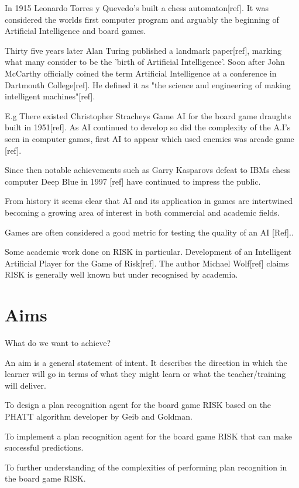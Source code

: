 \documentclass[parskip]{cs4rep}
\begin{document}
In 1915 Leonardo Torres y Quevedo's built a chess automaton[ref]. It was considered the worlds first computer program and arguably the beginning of Artificial Intelligence and board games.

Thirty five years later Alan Turing published a landmark paper[ref], marking what many consider to be the 'birth of Artificial Intelligence'. Soon after John McCarthy officially coined the term Artificial Intelligence at a conference in Dartmouth College[ref]. He defined it as "the science and engineering of making intelligent machines"[ref].

E.g
There existed Christopher Stracheys Game AI for the board game draughts built in 1951[ref]. As AI continued to develop so did the complexity of the A.I's seen in computer games, first AI to appear which used enemies was arcade game [ref].

Since then notable achievements such as Garry Kasparovs defeat to IBMs chess computer Deep Blue in 1997 [ref] have continued to impress the public. 

From history it seems clear that AI and its application in games are intertwined becoming a growing area of interest in both commercial and academic fields.

Games are often considered a good metric for testing the quality of an AI [Ref].. 

Some academic work done on RISK in particular. Development of an Intelligent Artificial Player for the Game of Risk[ref]. The author Michael Wolf[ref] claims RISK is generally well known but under recognised by academia.

\section{Aims}

What do we want to achieve?

An aim is a general statement of intent. It describes the direction in which the learner will go in terms of what they might learn or what the teacher/training will deliver.

To design a plan recognition agent for the board game RISK based on the PHATT algorithm developer by Geib and Goldman.

To implement a plan recognition agent for the board game RISK that can make successful predictions.

To further understanding of the complexities of performing plan recognition in the board game RISK.
\end{document}
